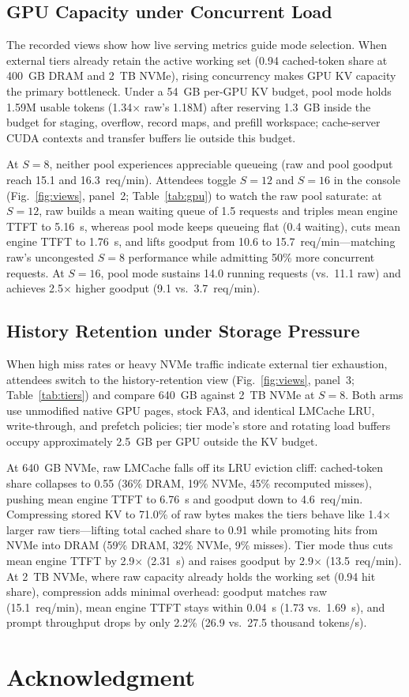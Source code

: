 \documentclass[conference]{IEEEtran}
\begin{document}
\subsection*{GPU Capacity under Concurrent Load}
The recorded views show how live serving metrics guide mode selection. When
external tiers already retain the active working set (0.94 cached-token share
at 400~GB DRAM and 2~TB NVMe), rising concurrency makes GPU KV capacity the
primary bottleneck. Under a 54~GB per-GPU KV budget, pool mode holds 1.59M
usable tokens (1.34$\times$ raw's 1.18M) after reserving 1.3~GB inside the
budget for staging, overflow, record maps, and prefill workspace; cache-server
CUDA contexts and transfer buffers lie outside this budget.

At $S{=}8$, neither pool experiences appreciable queueing (raw and pool goodput
reach 15.1 and 16.3~req/min). Attendees toggle $S{=}12$ and $S{=}16$ in the
console (Fig.~\ref{fig:views}, panel~2; Table~\ref{tab:gpu}) to watch the raw
pool saturate: at $S{=}12$, raw builds a mean waiting queue of 1.5 requests and
triples mean engine TTFT to 5.16~s, whereas pool mode keeps queueing flat
(0.4 waiting), cuts mean engine TTFT to 1.76~s, and lifts goodput from 10.6 to
15.7~req/min---matching raw's uncongested $S{=}8$ performance while admitting
50\% more concurrent requests. At $S{=}16$, pool mode sustains 14.0 running
requests (vs.\ 11.1 raw) and achieves 2.5$\times$ higher goodput (9.1 vs.\
3.7~req/min).

\subsection*{History Retention under Storage Pressure}
When high miss rates or heavy NVMe traffic indicate external tier exhaustion,
attendees switch to the history-retention view (Fig.~\ref{fig:views}, panel~3;
Table~\ref{tab:tiers})
and compare 640~GB against 2~TB NVMe at $S{=}8$. Both arms use unmodified
native GPU pages, stock FA3, and identical LMCache LRU, write-through, and
prefetch policies; tier mode's store and rotating load buffers occupy
approximately 2.5~GB per GPU outside the KV budget.

At 640~GB NVMe, raw LMCache falls off its LRU eviction cliff: cached-token
share collapses to 0.55 (36\% DRAM, 19\% NVMe, 45\% recomputed misses), pushing
mean engine TTFT to 6.76~s and goodput down to 4.6~req/min. Compressing stored
KV to 71.0\% of raw bytes makes the tiers behave like 1.4$\times$ larger raw
tiers---lifting total cached share to 0.91 while promoting hits from NVMe into
DRAM (59\% DRAM, 32\% NVMe, 9\% misses). Tier mode thus cuts mean engine TTFT
by 2.9$\times$ (2.31~s) and raises goodput by 2.9$\times$ (13.5~req/min). At
2~TB NVMe, where raw capacity already holds the working set (0.94 hit share),
compression adds minimal overhead: goodput matches raw (15.1~req/min), mean
engine TTFT stays within 0.04~s (1.73 vs.\ 1.69~s), and prompt throughput drops
by only 2.2\% (26.9 vs.\ 27.5 thousand tokens/s).

\balance
\section*{Acknowledgment}
\par\vspace*{3\baselineskip}



\end{document}
